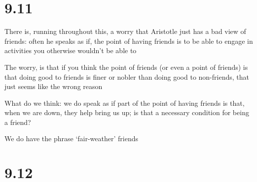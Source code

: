 \documentclass[11pt]{article}
\begin{document}
\section{9.11}

\noindent There is, running throughout this, a worry that Aristotle just has a bad view of friends: often he speaks as if, the point of having friends is to be able to engage in activities you otherwise wouldn't be able to
\vspace*{2mm}

\noindent The worry, is that if you think the point of friends (or even a point of friends) is that doing good to friends is finer or nobler than doing good to non-friends, that just seems like the wrong reason
\vspace*{2mm}

\noindent What do we think: we do speak as if part of the point of having friends is that, when we are down, they help bring us up; is that a necessary condition for being a friend?
\vspace*{2mm}

\noindent We do have the phrase `fair-weather' friends

\section{9.12}
\end{document}

